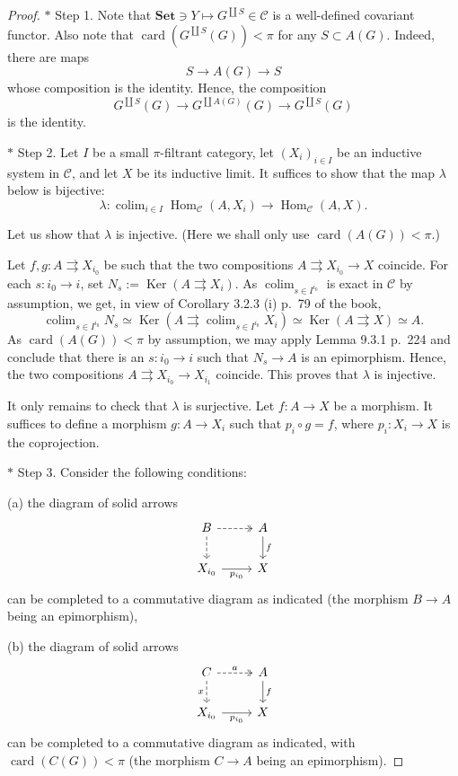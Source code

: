 \documentclass[12pt]{article}%
\theoremstyle{remark}
\theoremstyle{definition}
\newcommand{\nn}{\noindent}
\newcommand{\C}{\mathcal C}
\newcommand{\Set}{\mathbf{Set}}
\newcommand{\parar}{\rightrightarrows}
\DeclareMathOperator*{\colim}{colim}
\DeclareMathOperator{\card}{card}%
\DeclareMathOperator{\Hom}{Hom}%
\DeclareMathOperator{\Ker}{Ker}
\begin{document}
\begin{proof}
$*$ Step 1. Note that $\Set\ni Y\mapsto G^{\coprod S}\in\C$ is a well-defined covariant functor. Also note that $\card(G^{\coprod S}(G))<\pi$ for any $S\subset A(G)$. Indeed, there are maps 
$$S\to A(G)\to S$$ 
whose composition is the identity. Hence, the composition 
$$G^{\coprod S}(G)\to G^{\coprod A(G)}(G)\to G^{\coprod S}(G)$$ 
is the identity.

\nn $*$ Step 2. Let $I$ be a small $\pi$-filtrant category, let $(X_i)_{i\in I}$ be an inductive system in $\C$, and let $X$ be its inductive limit. It suffices to show that the map $\lambda$ below is bijective: 
$$
\lambda:\colim_{i\in I}\Hom_\C(A,X_i)\to\Hom_\C(A,X).
$$

Let us show that $\lambda$ is injective. (Here we shall only use $\card(A(G))<\pi$.)

Let $f,g:A\parar X_{i_0}$ be such that the two compositions $A\parar X_{i_0}\to X$ coincide. For each $s:i_0\to i$, set $N_s:=\Ker(A\parar X_i)$. As $\colim_{s\in I^{i_0}}$ is exact in $\C$ by assumption, we get, in view of Corollary 3.2.3 (i) p.~79 of the book, 
$$
\colim_{s\in I^{i_0}}N_s\simeq\Ker\left(A\parar\colim_{s\in I^{i_0}}X_i\right)\simeq\Ker(A\parar X)\simeq A.
$$ 
As $\card(A(G))<\pi$ by assumption, we may apply Lemma 9.3.1 p.~224 and conclude that there is an $s:i_0\to i$ such that $N_s\to A$ is an epimorphism. Hence, the two compositions $A\parar X_{i_0}\to X_{i_1}$ coincide. This proves that $\lambda$ is injective. 

It only remains to check that $\lambda$ is surjective. Let $f:A\to X$ be a morphism. It suffices to define a morphism $g:A\to X_i$ such that $p_i\circ g=f$, where $p_i:X_i\to X$ is the coprojection. 

\nn $*$ Step 3. Consider the following conditions:

\nn(a) the diagram of solid arrows 
$$
\begin{tikzcd}
B\ar[dashed,two heads]{r}\ar[dashed]{d}&A\ar{d}{f}\\ 
X_{i_0}\ar{r}[swap]{p_{i_0}}&X
\end{tikzcd}
$$
can be completed to a commutative diagram as indicated (the morphism $B\to A$ being an epimorphism),

\nn(b) the diagram of solid arrows 
%
\begin{equation}\label{fa}
\begin{tikzcd}
C\ar[dashed,two heads]{r}{a}\ar[dashed]{d}[swap]{x}&A\ar{d}{f}\\ 
X_{i_0}\ar{r}[swap]{p_{i_0}}&X
\end{tikzcd}
\end{equation}
%
can be completed to a commutative diagram as indicated, with $\card(C(G))<\pi$ (the morphism $C\to A$ being an epimorphism).


\end{proof}
\end{document}
